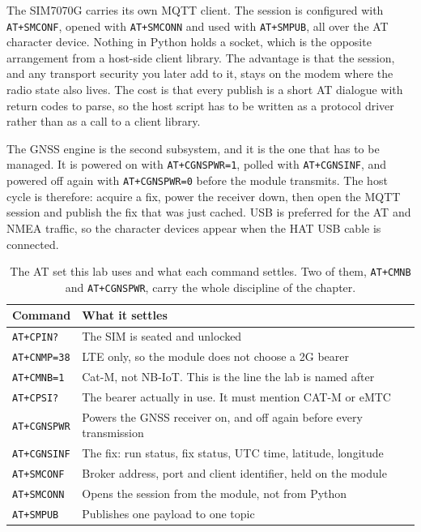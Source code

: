 
The SIM7070G carries its own MQTT client. The session is configured with \texttt{AT+SMCONF}, opened with \texttt{AT+SMCONN} and used with \texttt{AT+SMPUB}, all over the AT character device. Nothing in Python holds a socket, which is the opposite arrangement from a host-side client library. The advantage is that the session, and any transport security you later add to it, stays on the modem where the radio state also lives. The cost is that every publish is a short AT dialogue with return codes to parse, so the host script has to be written as a protocol driver rather than as a call to a client library.

The GNSS engine is the second subsystem, and it is the one that has to be managed. It is powered on with \texttt{AT+CGNSPWR=1}, polled with \texttt{AT+CGNSINF}, and powered off again with \texttt{AT+CGNSPWR=0} before the module transmits. The host cycle is therefore: acquire a fix, power the receiver down, then open the MQTT session and publish the fix that was just cached. USB is preferred for the AT and NMEA traffic, so the character devices appear when the HAT USB cable is connected.

\begin{table}[H]\centering\small
\begin{tabular}{p{34mm}p{112mm}}
\toprule
Command & What it settles \\
\midrule
\texttt{AT+CPIN?} & The SIM is seated and unlocked \\
\texttt{AT+CNMP=38} & LTE only, so the module does not choose a 2G bearer \\
\texttt{AT+CMNB=1} & Cat-M, not NB-IoT. This is the line the lab is named after \\
\texttt{AT+CPSI?} & The bearer actually in use. It must mention CAT-M or eMTC \\
\texttt{AT+CGNSPWR} & Powers the GNSS receiver on, and off again before every transmission \\
\texttt{AT+CGNSINF} & The fix: run status, fix status, UTC time, latitude, longitude \\
\texttt{AT+SMCONF} & Broker address, port and client identifier, held on the module \\
\texttt{AT+SMCONN} & Opens the session from the module, not from Python \\
\texttt{AT+SMPUB} & Publishes one payload to one topic \\
\bottomrule
\end{tabular}
\caption{The AT set this lab uses and what each command settles. Two of them, \texttt{AT+CMNB} and \texttt{AT+CGNSPWR}, carry the whole discipline of the chapter.}
\end{table}

